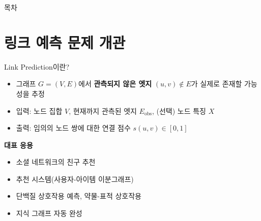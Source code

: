 \begin{frame}
  \titlepage
\end{frame}

\begin{frame}{목차}
  \tableofcontents
\end{frame}

\section{링크 예측 문제 개관}

\begin{frame}{Link Prediction이란?}
\begin{itemize}
  \item 그래프 $G=(V,E)$에서 \textbf{관측되지 않은 엣지} $(u,v) \notin E$가 실제로 존재할 가능성을 추정
  \item 입력: 노드 집합 $V$, 현재까지 관측된 엣지 $E_{\text{obs}}$, (선택) 노드 특징 $X$
  \item 출력: 임의의 노드 쌍에 대한 연결 점수 $s(u,v) \in [0,1]$
\end{itemize}
\vspace{0.4em}
\textbf{대표 응용}
\begin{itemize}
  \item 소셜 네트워크의 친구 추천
  \item 추천 시스템(사용자-아이템 이분그래프)
  \item 단백질 상호작용 예측, 약물-표적 상호작용
  \item 지식 그래프 자동 완성
\end{itemize}
\end{frame}

